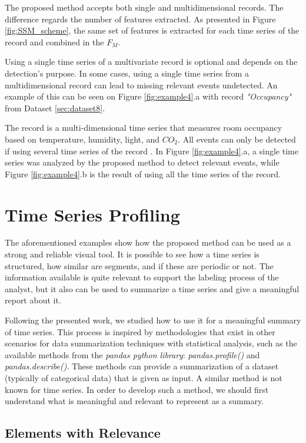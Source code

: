 {The proposed method accepts both single and multidimensional records. The difference regards the number of features extracted. As presented in Figure \ref{fig:SSM_scheme}, the same set of features is extracted for each time series of the record and combined in the $F_M$. 
\par
Using a single time series of a multivariate record is optional and depends on the detection's purpose. In some cases, using a single time series from a multidimensional record can lead to missing relevant events undetected. An example of this can be seen on Figure \ref{fig:example4}.a with record \textit{"Occupancy"} from Dataset \ref{sec:dataset8}. 
\par
The record is a multi-dimensional time series that measures room occupancy based on temperature, humidity, light, and $CO_2$. All events can only be detected if using several time series of the record \cite{cpd_alan}. In Figure \ref{fig:example4}.a, a single time series was analyzed by the proposed method to detect relevant events, while Figure \ref{fig:example4}.b is the result of using all the time series of the record.


\section{Time Series Profiling}

The aforementioned examples show how the proposed method can be used as a strong and reliable visual tool. It is possible to see how a time series is structured, how similar are segments, and if these are periodic or not. The information available is quite relevant to support the labeling process of the analyst, but it also can be used to summarize a time series and give a meaningful report about it. 
\par
Following the presented work, we studied how to use it for a meaningful summary of time series. This process is inspired by methodologies that exist in other scenarios for data summarization techniques with statistical analysis, such as the available methods from the \textit{pandas python library}: \textit{pandas.profile()} and \textit{pandas.describe()}. These methods can provide a summarization of a dataset (typically of categorical data) that is given as input. A similar method is not known for time series. In order to develop such a method, we should first understand what is meaningful and relevant to represent as a summary.

\subsection{Elements with Relevance}

}
